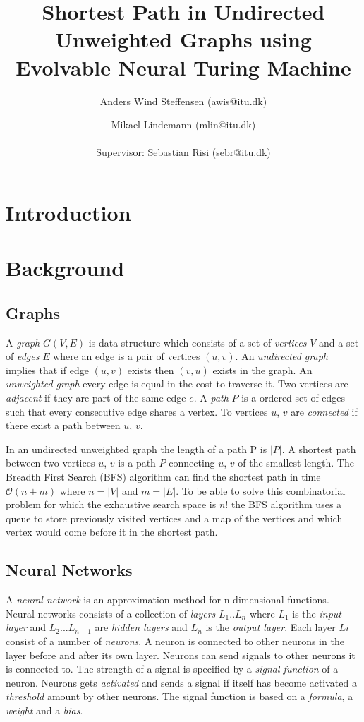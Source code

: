 \documentclass{article}
\author{Anders Wind Steffensen (awis@itu.dk)\and Mikael Lindemann (mlin@itu.dk)\\\\Supervisor: Sebastian Risi (sebr@itu.dk)}
\title{Shortest Path in Undirected Unweighted Graphs using Evolvable Neural Turing Machine}
\begin{document}
\maketitle
\tableofcontents
\newpage
\section{Introduction}
\section{Background}
\subsection{Graphs}
A \textit{graph} $G(V,E)$ is data-structure which consists of a set of \textit{vertices} $V$ and a set of \textit{edges} $E$ where an edge is a pair of vertices $(u,v)$. An \textit{undirected graph} implies that if edge $ (u,v) $ exists then $ (v,u) $ exists in the graph. An \textit{unweighted graph} every edge is equal in the cost to traverse it. 
Two vertices are \textit{adjacent} if they are part of the same edge $ e $. A \textit{path} $ P $ is a ordered set of edges such that every consecutive edge shares a vertex. To vertices $ u $, $ v $ are \textit{connected} if there exist a path between $ u $, $ v $.

In an undirected unweighted graph the length of a path P is $ |P| $. A shortest path between two vertices  $ u $, $ v $ is a path $ P $ connecting  $ u $, $ v $ of the smallest length. The Breadth First Search (BFS) algorithm can find the shortest path in time $ \mathcal{O}(n+m) $ where $ n=|V| $ and $ m=|E| $. To be able to solve this combinatorial problem for which the exhaustive search space is $ n! $ the BFS algorithm uses a queue to store previously visited vertices and a map of the vertices and which vertex would come before it in the shortest path.


\subsection{Neural Networks}
A \textit{neural network} is an approximation method for n dimensional functions. Neural networks consists of a collection of \textit{layers} $ L_1 .. L_n $ where $ L_1 $ is the \textit{input layer} and $ L_2 ... L_{n-1} $ are \textit{hidden layers} and $ L_n $ is the \textit{output layer}. Each layer $ Li $ consist of a number of \textit{neurons}. A neuron is connected to other neurons in the layer before and after its own layer. Neurons can send signals to other neurons it is connected to. The strength of a signal is specified by a \textit{signal function} of a neuron. Neurons gets \textit{activated} and sends a signal if itself has become activated a \textit{threshold} amount by other neurons. The signal function is based on a \textit{formula}, a \textit{weight} and a \textit{bias}. 
\end{document}
